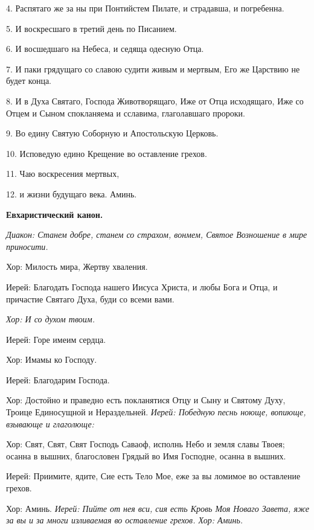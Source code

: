   4. Распятаго же за ны при Понтийстем Пилате, и страдавша, и погребенна.


  5. И воскресшаго в третий день по Писанием.


  6. И восшедшаго на Небеса, и седяща одесную Отца.


  7. И паки грядущаго со славою судити живым и мертвым, Его же Царствию не будет конца.


  8. И в Духа Святаго, Господа Животворящаго, Иже от Отца исходящаго, Иже со Отцем и Сыном спокланяема и сславима, глаголавшаго пророки.


  9. Во едину Святую Соборную и Апостольскую Церковь.


  10. Исповедую едино Крещение во оставление грехов.


  11. Чаю воскресения мертвых,


  12. и жизни будущаго века. Аминь. 


\medskip


\bfseries  Евхаристический канон. \normalfont{}


\itshape  Диакон:\normalfont{} Станем добре, станем со страхом, вонмем, Святое Возношение в мире приносити\itshape . 


  Хор:\normalfont{} Милость мира, Жертву хваления. \itshape 


  Иерей:\normalfont{} Благодать Господа нашего Иисуса Христа, и любы Бога и Отца, и причастие Святаго Духа, буди со всеми вами.


\itshape Хор:\normalfont{} И со духом твоим. \itshape 


  Иерей:\normalfont{} Горе имеим сердца. \itshape 


  Хор:\normalfont{} Имамы ко Господу. \itshape 


  Иерей:\normalfont{} Благодарим Господа. \itshape 


  Хор:\normalfont{} Достойно и праведно есть покланятися Отцу и Сыну и Святому Духу, Троице Единосущной и Нераздельней. \itshape  Иерей:\normalfont{} Победную песнь ноюще, вопиюще, взывающе и глаголюще: \itshape 


  Хор:\normalfont{} Свят, Свят, Свят Господь Саваоф, исполнь Небо и земля славы Твоея; осанна в вышних, благословен Грядый во Имя Господне, осанна в вышних. \itshape 


  Иерей:\normalfont{} Приимите, ядите, Сие есть Тело Мое, еже за вы ломимое во оставление грехов. \itshape 


  Хор:\normalfont{} Аминь. \itshape  Иерей:\normalfont{} Пийте от нея вси, сия есть Кровь Моя Новаго Завета, яже за вы и за многи изливаемая во оставление грехов. \itshape  Хор:\normalfont{} Аминь. 



